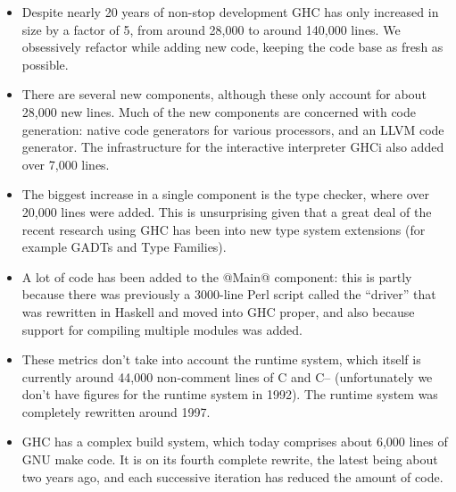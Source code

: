 \documentclass{article}
\begin{document}
\begin{itemize}
\item Despite nearly 20 years of non-stop development GHC has only
  increased in size by a factor of 5, from around 28,000 to around
  140,000 lines.  We obsessively refactor while adding new code,
  keeping the code base as fresh as possible.

\item There are several new components, although these only account
  for about 28,000 new lines.  Much of the new components are
  concerned with code generation: native code generators for various
  processors, and an LLVM code generator.  The infrastructure for the
  interactive interpreter GHCi also added over 7,000 lines.

\item The biggest increase in a single component is the type checker,
  where over 20,000 lines were added.  This is unsurprising given that
  a great deal of the recent research using GHC has been into new type
  system extensions (for example GADTs and Type Families).

\item A lot of code has been added to the @Main@ component: this is
  partly because there was previously a 3000-line Perl script
  called the ``driver'' that was rewritten in Haskell and moved into
  GHC proper, and also because support for compiling multiple modules
  was added.

\item These metrics don't take into account the runtime system, which
  itself is currently around 44,000 non-comment lines of C and C--
  (unfortunately we don't have figures for the runtime system in
  1992).  The runtime system was completely rewritten around 1997.

\item GHC has a complex build system, which today comprises about
  6,000 lines of GNU make code.  It is on its fourth complete rewrite,
  the latest being about two years ago, and each successive iteration
  has reduced the amount of code.
\end{itemize}
\end{document}
